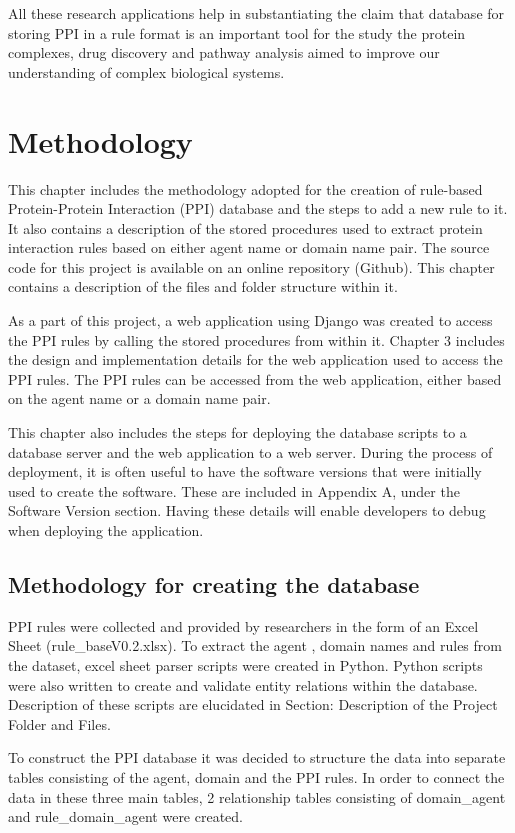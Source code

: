 \documentclass[msc,deptreport,ai]{infthesis}      %
\begin{document}
All these research applications help in substantiating the claim that database for storing PPI in a rule format is an important tool for the study the protein complexes, drug discovery and pathway analysis aimed to improve our understanding of complex biological systems.
 

\chapter{Methodology}
This chapter includes the methodology adopted for the creation of rule-based Protein-Protein Interaction (PPI) database and the steps to add a new rule to it. It also contains a description of the stored procedures used to extract protein interaction rules based on either agent name or domain name pair. The source code for this project is available on an online repository (Github). This chapter contains a description of the files and folder structure within it. 

As a part of this project, a web application using Django \cite{django} was created to access the PPI rules by calling the stored procedures from within it. Chapter 3 includes the design and implementation details for the web application used to access the PPI rules. The PPI rules can be accessed from the web application, either based on the agent name or a domain name pair. 

This chapter also includes the steps for deploying the database scripts to a database server and the web application to a web server. During the process of deployment, it is often useful to have the software versions that were initially used to create the software. These are included in Appendix A, under the Software Version section. Having these details will enable developers to debug when deploying the application.

\section{Methodology for creating the database}
PPI rules were collected and provided by researchers in the form of an Excel Sheet (rule\_baseV0.2.xlsx). To extract the agent , domain names and rules from the dataset, excel sheet parser scripts were created in Python. Python scripts were also written to create and validate entity relations within the database. Description of these scripts are elucidated in Section: Description of the Project Folder and Files.

To construct the PPI database it was decided to structure the data into separate tables consisting of the agent, domain and the PPI rules. In order to connect the data in these three main tables, 2 relationship tables consisting of domain\_agent and rule\_domain\_agent were created.
\end{document}
